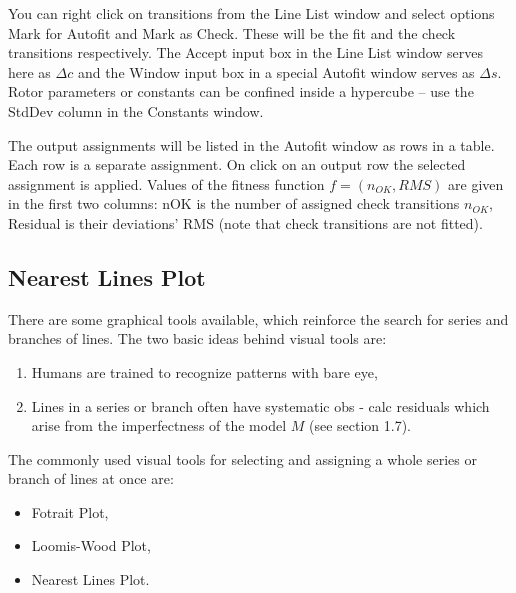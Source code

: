 \documentclass[11pt]{article}
\begin{document}

You can right click on transitions from the Line List window and select options Mark for Autofit and Mark as Check. These will be the fit and the check transitions respectively. The Accept input box in the Line List window serves here as $\Delta c$ and the Window input box in a special Autofit window serves as $\Delta s$. Rotor parameters or constants can be confined inside a hypercube -- use the StdDev column in the Constants window.

The output assignments will be listed in the Autofit window as rows in a table. Each row is a separate assignment. On click on an output row the selected assignment is applied. Values of the fitness function $f = (n_{OK}, {RMS})$ are given in the first two columns: nOK is the number of assigned check transitions $n_{OK}$, Residual is their deviations' RMS (note that check transitions are not fitted).


\subsection{Nearest Lines Plot}

There are some graphical tools available, which reinforce the search for series and branches of lines. The two basic ideas behind visual tools are:
\begin{enumerate}
    \item Humans are trained to recognize patterns with bare eye,
    \item Lines in a series or branch often have systematic obs - calc residuals which arise from the imperfectness of the model $M$ (see section 1.7). 
\end{enumerate}

The commonly used visual tools for selecting and assigning a whole series or branch of lines at once are:
\begin{itemize}
    \item Fotrait Plot,
    \item Loomis-Wood Plot,
    \item Nearest Lines Plot.
\end{itemize}
\end{document}
